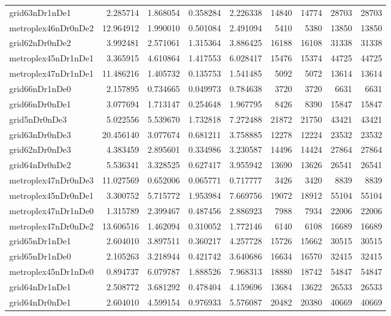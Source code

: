 \begin{longtable}{|l|r|r|r|r|r|r|r|r|}
grid63nDr1nDe1 & 2.285714 & 1.868054 & 0.358284 & 2.226338 & 14840 & 14774 & 28703 & 28703 \\
metroplex46nDr0nDe2 & 12.964912 & 1.990010 & 0.501084 & 2.491094 & 5410 & 5380 & 13850 & 13850 \\
grid62nDr0nDe2 & 3.992481 & 2.571061 & 1.315364 & 3.886425 & 16188 & 16108 & 31338 & 31338 \\
metroplex45nDr1nDe1 & 3.365915 & 4.610864 & 1.417553 & 6.028417 & 15476 & 15374 & 44725 & 44725 \\
metroplex47nDr1nDe1 & 11.486216 & 1.405732 & 0.135753 & 1.541485 & 5092 & 5072 & 13614 & 13614 \\
grid66nDr1nDe0 & 2.157895 & 0.734665 & 0.049973 & 0.784638 & 3720 & 3720 & 6631 & 6631 \\
grid66nDr0nDe1 & 3.077694 & 1.713147 & 0.254648 & 1.967795 & 8426 & 8390 & 15847 & 15847 \\
grid5nDr0nDe3 & 5.022556 & 5.539670 & 1.732818 & 7.272488 & 21872 & 21750 & 43421 & 43421 \\
grid63nDr0nDe3 & 20.456140 & 3.077674 & 0.681211 & 3.758885 & 12278 & 12224 & 23532 & 23532 \\
grid62nDr0nDe3 & 4.383459 & 2.895601 & 0.334986 & 3.230587 & 14496 & 14424 & 27864 & 27864 \\
grid64nDr0nDe2 & 5.536341 & 3.328525 & 0.627417 & 3.955942 & 13690 & 13626 & 26541 & 26541 \\
metroplex47nDr0nDe3 & 11.027569 & 0.652006 & 0.065771 & 0.717777 & 3426 & 3420 & 8839 & 8839 \\
metroplex45nDr0nDe1 & 3.300752 & 5.715772 & 1.953984 & 7.669756 & 19072 & 18912 & 55104 & 55104 \\
metroplex47nDr1nDe0 & 1.315789 & 2.399467 & 0.487456 & 2.886923 & 7988 & 7934 & 22006 & 22006 \\
metroplex47nDr0nDe2 & 13.606516 & 1.462094 & 0.310052 & 1.772146 & 6140 & 6108 & 16689 & 16689 \\
grid65nDr1nDe1 & 2.604010 & 3.897511 & 0.360217 & 4.257728 & 15726 & 15662 & 30515 & 30515 \\
grid65nDr1nDe0 & 2.105263 & 3.218944 & 0.421742 & 3.640686 & 16634 & 16570 & 32415 & 32415 \\
metroplex45nDr1nDe0 & 0.894737 & 6.079787 & 1.888526 & 7.968313 & 18880 & 18742 & 54847 & 54847 \\
grid64nDr1nDe1 & 2.508772 & 3.681292 & 0.478404 & 4.159696 & 13684 & 13622 & 26533 & 26533 \\
grid64nDr0nDe1 & 2.604010 & 4.599154 & 0.976933 & 5.576087 & 20482 & 20380 & 40669 & 40669 \\

\end{longtable}
